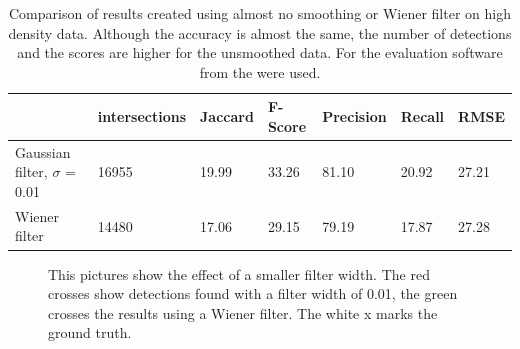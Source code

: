 \begin{table}
\caption{Comparison of results created using almost no smoothing or Wiener filter on high density data. Although the accuracy is almost the same, the number of detections and the scores are higher for the unsmoothed data. For the evaluation software from the \cite{challenge} were used.}
\begin{tabular}{l|llllll}
&intersections&Jaccard&F-Score&Precision&Recall&RMSE\\ \hline
Gaussian filter, $\sigma$ = 0.01& 16955&19.99&33.26&81.10&20.92&27.21\\
Wiener filter& 14480&17.06&29.15&79.19&17.87&27.28
\end{tabular} \label{tabelbetterthansimplestorm}

\end{table}


\begin{figure}
\hfill
{}
	\caption{This pictures show the effect of a smaller filter width. The red crosses show detections found with a filter width of 0.01, the green crosses the results using a Wiener filter. The white x marks the ground truth.}
	\label{betterthansimplestorm}	
\end{figure}

